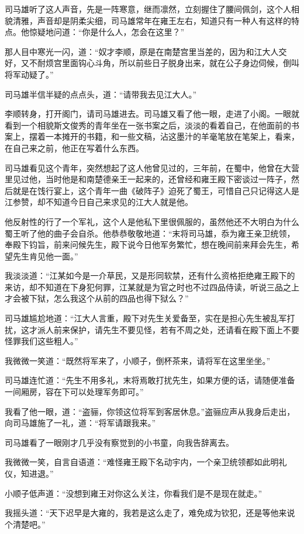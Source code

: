 司马雄听了这人声音，先是一阵寒意，继而凛然，立刻握住了腰间佩剑，这个人相貌清雅，声音却是阴柔尖细，司马雄常年在雍王左右，知道只有一种人有这样的特点。他惊疑地问道：“你是什么人，怎会在这里？”

那人目中寒光一闪，道：“奴才李顺，原是在南楚宫里当差的，因为和江大人交好，又不耐烦宫里面钩心斗角，所以前些日子脱身出来，就在公子身边伺候，倒叫将军动疑了。”

司马雄半信半疑的点点头，道：“请带我去见江大人。”

李顺转身，打开阁门，请司马雄进去。司马雄又看了他一眼，走进了小阁。一眼就看到一个相貌斯文俊秀的青年坐在一张书案之后，淡淡的看着自己，在他面前的书案上，摆着一本摊开的书籍，和一些文稿，沾这墨汁的羊毫笔放在笔架上，看来，在自己来之前，他正在写着什么东西。

司马雄看见这个青年，突然想起了这人他曾见过的，三年前，在蜀中，他曾在大营里见过他，当时他是和南楚德亲王一起来的，还曾经和雍王殿下密谈过一阵子，然后就是在饯行宴上，这个青年一曲《破阵子》迫死了蜀王，可惜自己只记得这人是江参赞，却不知道今日自己来求见的江大人就是他。

他反射性的行了一个军礼，这个人是他私下里很佩服的，虽然他还不大明白为什么蜀王听了他的曲子会自杀。他恭恭敬敬地道：“末将司马雄，忝为雍王亲卫统领，奉殿下钧旨，前来问候先生，殿下说今日他军务繁忙，想在晚间前来拜会先生，希望先生肯见他一面。”

我淡淡道：“江某如今是一介草民，又是形同软禁，还有什么资格拒绝雍王殿下的来访，却不知道在下身犯何罪，江某就是为官之时也不过四品侍读，听说三品之上才会被下狱，怎么我这个从前的四品也得下狱么？”

司马雄尴尬地道：“江大人言重，殿下对先生关爱备至，实在是担心先生被乱军打扰，这才派人前来保护，请先生不要见怪，若有不周之处，还请看在殿下面上不要怪罪我们这些粗人。”

我微微一笑道：“既然将军来了，小顺子，倒杯茶来，请将军在这里坐坐。”

司马雄连忙道：“先生不用多礼，末将焉敢打扰先生，如果方便的话，请随便准备一间厢房，容在下可以处理军务即可。”

我看了他一眼，道：“盗骊，你领这位将军到客居休息。”盗骊应声从我身后走出，向司马雄施了一礼，道：“将军请跟我来。”

司马雄看了一眼刚才几乎没有察觉到的小书童，向我告辞离去。

我微微一笑，自言自语道：“难怪雍王殿下名动宇内，一个亲卫统领都如此明礼仪，知进退。”

小顺子低声道：“没想到雍王对你这么关注，你看我们是不是现在就走。”

我摇头道：“天下迟早是大雍的，我若是这么走了，难免成为钦犯，还是等他来说个清楚吧。”


